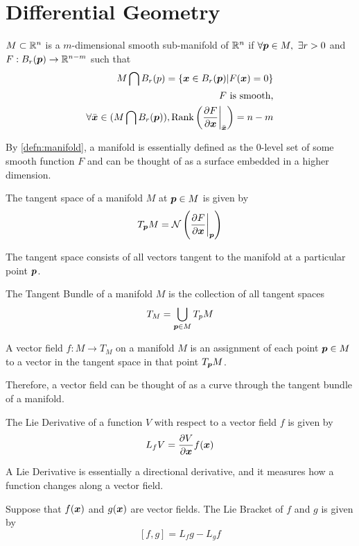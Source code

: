 \section{Differential Geometry}
\begin{definition}
	$M\subset \mathbb{R}^n$ is a $m$-dimensional smooth sub-manifold of $\mathbb{R}^n$ if $\forall
	\boldsymbol{p}\in M,\ \exists r > 0$ and $F: B_r(\boldsymbol{p}) \to \mathbb{R}^{n-m}$ such that \[
		\begin{aligned}
			M \bigcap B_r(p) = \{\boldsymbol{x}\in B_r(\boldsymbol{p}) | F(\boldsymbol{x}) = 0\}\\
			F\text{ is smooth,}\\
			\forall \bar{\boldsymbol{x}} \in (M \bigcap B_r(\boldsymbol{p})),
			\text{Rank}\left(\frac{\partial F}{\partial \boldsymbol{x}}
			\bigg\rvert_{\bar{\boldsymbol{x}}}\right) = n - m
		\end{aligned}
	\]
	\label{defn:manifold}
\end{definition}
By \cref{defn:manifold}, a manifold is essentially defined as the 0-level set of
some smooth function $F$ and can be thought of as a surface embedded in a higher
dimension.
\begin{definition}
	The tangent space of a manifold $M$ at $\boldsymbol{p}\in M$ is given by \[
		T_{\boldsymbol{p}}M = \mathcal{N}\left(\frac{\partial F}{\partial
		\boldsymbol{x}}\bigg |_{\boldsymbol{p}}\right)
	\]
	\label{defn:tangent-space}
\end{definition}
The tangent space consists of all vectors tangent to the manifold at a
particular point $\boldsymbol{p}$.
\begin{definition}
	The Tangent Bundle of a manifold $M$ is the collection of all tangent spaces \[
		T_M = \bigcup_{\boldsymbol{p}\in M} T_p M
	\]
	\label{defn:tangent-bundle}
\end{definition}
\begin{definition}
	A vector field $f:M\to T_M$ on a manifold $M$ is an assignment of each point $\boldsymbol{p}\in
	M$ to a vector in the tangent space in that point $T_{\boldsymbol{p}}M$.
	\label{defn:vector-field}
\end{definition}
Therefore, a vector field can be thought of as a curve through the tangent
bundle of a manifold.
\begin{definition}
	The Lie Derivative of a function $V$ with respect to a vector field $f$ is
	given by \[
		L_fV = \frac{\partial V}{\partial \boldsymbol{x}} f(\boldsymbol{x})
	\]
	\label{defn:lie-derivative}
\end{definition}
A Lie Derivative is essentially a directional derivative, and it measures how a
function changes along a vector field.
\begin{definition}
	Suppose that $f(\boldsymbol{x})$ and $g(\boldsymbol{x})$ are vector fields. The Lie Bracket of
	$f$ and $g$ is given by \[
		[f, g] = L_fg - L_gf
	\]
	\label{defn:lie-bracket}
\end{definition}
